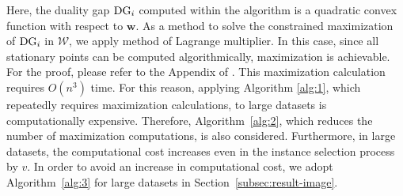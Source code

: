 %
Here, the duality gap ${\rm DG}_i$ computed within the algorithm is a quadratic convex function with respect to $\bm w$.
%
%
As a method to solve the constrained maximization of ${\rm DG}_i$ in $\mathcal{W}$, we apply method of Lagrange multiplier. In this case, since all stationary points can be computed algorithmically, maximization is achievable.
%
For the proof, please refer to the Appendix of \citet{hanada2024distributionallyrobustsafesample}.
%
%
This maximization calculation requires $O\left(n^3\right)$ time.
%
For this reason, applying Algorithm \ref{alg:1}, which repeatedly requires maximization calculations, to large datasets is computationally expensive.
%
Therefore, Algorithm~\ref{alg:2}, which reduces the number of maximization computations, is also considered.
%
Furthermore, in large datasets, the computational cost increases even in the instance selection process by $v$.
%
In order to avoid an increase in computational cost, we adopt Algorithm~\ref{alg:3} for large datasets in Section~\ref{subsec:result-image}.

